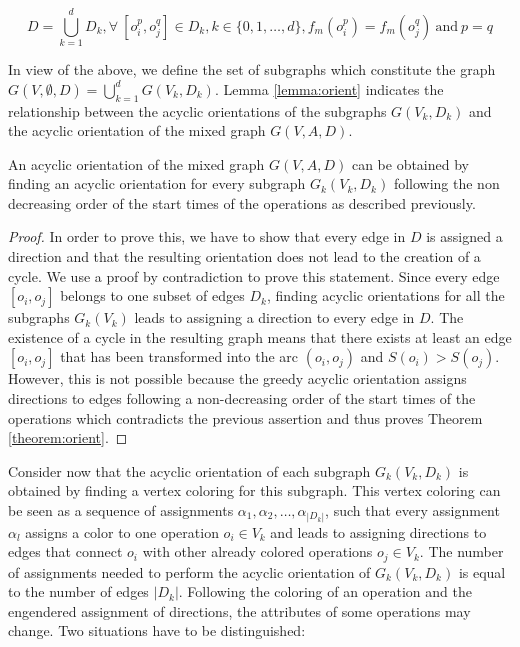 \begin{equation}
D = \bigcup_{k=1}^d D_k, \forall\ [o_i^p, o_j^q] \in D_k, k \in \{0, 1, \ldots, d\}, f_m(o_i^p)=f_m(o_j^q)\ \text{and}\ p = q
\label{eq:opsubset}
\end{equation}

In view of the above, we define the set of subgraphs which constitute the graph $G(V,\emptyset,D) = \bigcup_{k=1}^d G(V_k,D_k)$. Lemma \ref{lemma:orient} indicates the relationship between the acyclic orientations of the subgraphs $G(V_k,D_k)$ and the acyclic orientation of the mixed graph $G(V,A,D)$.

\begin{theorem}
An acyclic orientation of the mixed graph $G(V,A,D)$ can be obtained by finding an acyclic orientation for every subgraph $G_k(V_k,D_k)$ following the non decreasing order of the start times of the operations as described previously.
\label{theorem:orient}
\end{theorem}

\begin{proof}
In order to prove this, we have to show that every edge in $D$ is assigned a	direction and that the resulting orientation does not lead to the creation of a cycle. We use a proof by contradiction to prove this statement. Since every edge $[o_i, o_j]$ belongs to one subset of edges $D_k$, finding acyclic orientations for all the subgraphs $G_k(V_k)$ leads to assigning a direction to every edge in $D$. The existence of a cycle in the resulting graph means that there exists at least an edge $[o_i,o_j]$ that has been transformed into the arc $(o_i,o_j)$ and $S(o_i) > S(o_j)$. However, this is not possible because the greedy acyclic orientation assigns directions to edges following a non-decreasing order of the start times of the operations which contradicts the previous assertion and thus proves Theorem \ref{theorem:orient}.
\end{proof}

Consider now that the acyclic orientation of each subgraph $G_k(V_k,D_k)$ is obtained by finding a vertex coloring for this subgraph. This vertex coloring can be seen as a sequence of assignments $\alpha_1, \alpha_2, \ldots, \alpha_{|D_k|}$, such that every assignment $\alpha_l$ assigns a color to one operation $o_i \in V_k$ and leads to assigning directions to edges that connect $o_i$ with other already colored operations $o_j \in V_k$. The number of assignments needed to perform the acyclic orientation of $G_k(V_k,D_k)$ is equal to the number of edges $|D_k|$. Following the coloring of an operation and the engendered assignment of directions, the attributes of some operations may change. Two situations have to be distinguished:

